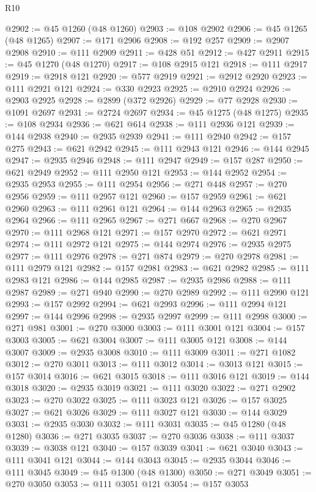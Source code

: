 \begin{lexlean}{R10}
\begin{coremodule}
{{{{{{{{{{{{{{{{{{{{{{{{{{{{{{{{{{{{{{{{{{{{{{{{{{{{{{{{{{{{{{{{{{{{{{{{{{{{{{{{{{{{{{{{{{{{{{{{{{{{{{{{{{{{@2902 := @45 @1260 (@48 @1260)
@2903 := @108 @2902
@2906 := @45 @1265 (@48 @1265)
@2907 := @171 @2906
@2908 := @192 @257
@2909 := @2907 @2908
@2910 := @111 @2909
@2911 := @428 @51
@2912 := @427 @2911
@2915 := @45 @1270 (@48 @1270)
@2917 := @108 @2915 @121
@2918 := @111 @2917
@2919 := @2918 @121
@2920 := @577 @2919
@2921 := @2912 @2920
@2923 := @111 @2921 @121
@2924 := @330 @2923
@2925 := @2910 @2924
@2926 := @2903 @2925
@2928 := @2899 (@372 @2926)
@2929 := @77 @2928
@2930 := @1091 @2697
@2931 := @2724 @2697
@2934 := @45 @1275 (@48 @1275)
@2935 := @108 @2934
@2936 := @621 @614
@2938 := @111 @2936 @121
@2939 := @144 @2938
@2940 := @2935 @2939
@2941 := @111 @2940
@2942 := @157 @275
@2943 := @621 @2942
@2945 := @111 @2943 @121
@2946 := @144 @2945
@2947 := @2935 @2946
@2948 := @111 @2947
@2949 := @157 @287
@2950 := @621 @2949
@2952 := @111 @2950 @121
@2953 := @144 @2952
@2954 := @2935 @2953
@2955 := @111 @2954
@2956 := @271 @448
@2957 := @270 @2956
@2959 := @111 @2957 @121
@2960 := @157 @2959
@2961 := @621 @2960
@2963 := @111 @2961 @121
@2964 := @144 @2963
@2965 := @2935 @2964
@2966 := @111 @2965
@2967 := @271 @667
@2968 := @270 @2967
@2970 := @111 @2968 @121
@2971 := @157 @2970
@2972 := @621 @2971
@2974 := @111 @2972 @121
@2975 := @144 @2974
@2976 := @2935 @2975
@2977 := @111 @2976
@2978 := @271 @874
@2979 := @270 @2978
@2981 := @111 @2979 @121
@2982 := @157 @2981
@2983 := @621 @2982
@2985 := @111 @2983 @121
@2986 := @144 @2985
@2987 := @2935 @2986
@2988 := @111 @2987
@2989 := @271 @940
@2990 := @270 @2989
@2992 := @111 @2990 @121
@2993 := @157 @2992
@2994 := @621 @2993
@2996 := @111 @2994 @121
@2997 := @144 @2996
@2998 := @2935 @2997
@2999 := @111 @2998
@3000 := @271 @981
@3001 := @270 @3000
@3003 := @111 @3001 @121
@3004 := @157 @3003
@3005 := @621 @3004
@3007 := @111 @3005 @121
@3008 := @144 @3007
@3009 := @2935 @3008
@3010 := @111 @3009
@3011 := @271 @1082
@3012 := @270 @3011
@3013 := @111 @3012
@3014 := @3013 @121
@3015 := @157 @3014
@3016 := @621 @3015
@3018 := @111 @3016 @121
@3019 := @144 @3018
@3020 := @2935 @3019
@3021 := @111 @3020
@3022 := @271 @2902
@3023 := @270 @3022
@3025 := @111 @3023 @121
@3026 := @157 @3025
@3027 := @621 @3026
@3029 := @111 @3027 @121
@3030 := @144 @3029
@3031 := @2935 @3030
@3032 := @111 @3031
@3035 := @45 @1280 (@48 @1280)
@3036 := @271 @3035
@3037 := @270 @3036
@3038 := @111 @3037
@3039 := @3038 @121
@3040 := @157 @3039
@3041 := @621 @3040
@3043 := @111 @3041 @121
@3044 := @144 @3043
@3045 := @2935 @3044
@3046 := @111 @3045
@3049 := @45 @1300 (@48 @1300)
@3050 := @271 @3049
@3051 := @270 @3050
@3053 := @111 @3051 @121
@3054 := @157 @3053
}}}}}}}}}}}}}}}}}}}}}}}}}}}}}}}}}}}}}}}}}}}}}}}}}}}}}}}}}}}}}}}}}}}}}}}}}}}}}}}}}}}}}}}}}}}}}}}}}}}}}}}}}}}}
\end{coremodule}
\end{lexlean}
